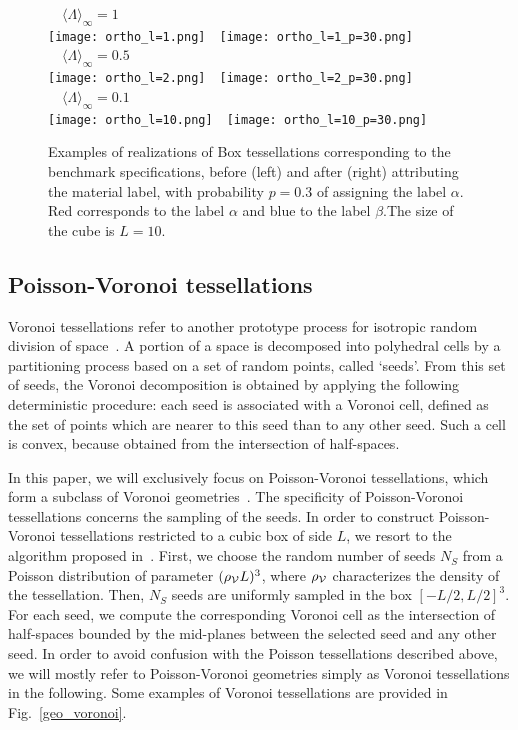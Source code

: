 \documentclass[final,authoryear,5p,times,twocolumn]{elsarticle}
\begin{document}
\begin{figure}[t]
\begin{center}
\,\,\,\, ${\langle \Lambda \rangle}_{\infty} =1$ \,\,\,\,\\
\texttt{[image: ortho\_l=1.png]}\,\,\,\,
\texttt{[image: ortho\_l=1\_p=30.png]}\\
\,\,\,\, ${\langle \Lambda \rangle}_{\infty} =0.5$ \,\,\,\,\\
\texttt{[image: ortho\_l=2.png]}\,\,\,\,
\texttt{[image: ortho\_l=2\_p=30.png]}\\
\,\,\,\, ${\langle \Lambda \rangle}_{\infty} =0.1$ \,\,\,\,\\
\texttt{[image: ortho\_l=10.png]}\,\,\,\,
\texttt{[image: ortho\_l=10\_p=30.png]}\\
\end{center}
\caption{Examples of realizations of Box tessellations corresponding to the benchmark specifications, before (left) and after (right) attributing the material label, with probability $p=0.3$ of assigning the label $\alpha$. Red corresponds to the label $\alpha$ and blue to the label $\beta$.The size of the cube is $L=10$.}
\label{geo_ortho}
\end{figure}

\subsection{Poisson-Voronoi tessellations}
\label{voronoi}

Voronoi tessellations refer to another prototype process for isotropic random division of space~\cite{santalo}. A portion of a space is decomposed into polyhedral cells by a partitioning process based on a set of random points, called `seeds'. From this set of seeds, the Voronoi decomposition is obtained by applying the following deterministic procedure: each seed is associated with a Voronoi cell, defined as the set of points which are nearer to this seed than to any other seed. Such a cell is convex, because obtained from the intersection of half-spaces.

In this paper, we will exclusively focus on Poisson-Voronoi tessellations, which form a subclass of Voronoi geometries~\cite{meijering, gilbert, miles1972}. The specificity of Poisson-Voronoi tessellations concerns the sampling of the seeds. In order to construct Poisson-Voronoi tessellations restricted to a cubic box of side $L$, we resort to the algorithm proposed in~\cite{miles1972}. First, we choose the random number of seeds $N_S$ from a Poisson distribution of parameter $(\rho_{\cal V} L)^3$, where $\rho_{\cal V}$ characterizes the density of the tessellation. Then, $N_S$ seeds are uniformly sampled in the box $[-L/2,L/2]^3$. For each seed, we compute the corresponding Voronoi cell as the intersection of half-spaces bounded by the mid-planes between the selected seed and any other seed. In order to avoid confusion with the Poisson tessellations described above, we will mostly refer to Poisson-Voronoi geometries simply as Voronoi tessellations in the following. Some examples of Voronoi tessellations are provided in Fig.~\ref{geo_voronoi}. 
\end{document}
